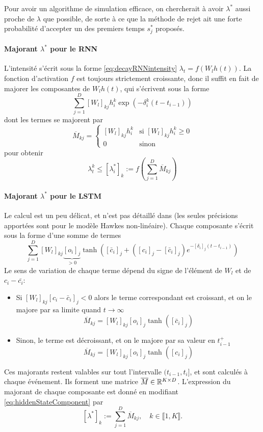 \documentclass[../main.tex]{subfiles}
\begin{document}
Pour avoir un algorithme de simulation efficace, on chercherait à avoir $\lambda^*$ aussi proche de $\lambda$ que possible, de sorte à ce que la méthode de rejet ait une forte probabilité d'accepter un des premiers temps $s_j^*$ proposés.\footnotemark


\paragraph{Majorant $\lambda^*$ pour le RNN} L'intensité s'écrit sous la forme \eqref{eq:decayRNNintensity} $\lambda_t = f(W_lh(t))$. La fonction d'activation $f$ est toujours strictement croissante, donc il suffit en fait de majorer les composantes de $W_lh(t)$, qui s'écrivent sous la forme
\[
	\sum_{j=1}^D {[W_l]}_{kj}h^k_{i}\exp(-\delta^k_i(t-t_{i-1}))
\]
dont les termes se majorent par
\[
	\overline{M}_{kj} = \begin{cases}
	{[W_l]}_{kj}h^k_i &\mbox{si }{[W_l]}_{kj}h^k_i \geq 0 \\
	0 &\mbox{sinon}
	\end{cases}
\]
pour obtenir
\[
	\lambda_t^k \leq {[\lambda_i^*]}_k := f\left(\sum_{j=1}^D \overline{M}_{kj}\right)
\]

\paragraph{Majorant $\lambda^*$ pour le LSTM} Le calcul est un peu délicat, et n'est pas détaillé dans \autocite{meiEisnerNeuralHawkes} (les seules précisions apportées sont pour le modèle Hawkes non-linéaire).
Chaque composante s'écrit sous la forme d'une somme de termes
\begin{equation}\label{eq:hiddenStateComponent}
	\sum_{j=1}^{D} {[W_l]}_{kj} \underbrace{{[o_i]}_j}_{>0}
	\tanh \left( [\bar{c}_{i}]_j + \left([c_{i}]_j - [\bar{c}_{i}]_j \right)e^{-[\delta_i]_j (t-t_{i-1})}
	\right)
\end{equation}
Le sens de variation de chaque terme dépend du signe de l'élément de $W_l$ et de $c_i - \bar{c_i}$:
\begin{itemize}
	\item Si ${[W_l]}_{kj}{[c_i - \bar{c}_i]}_{j} < 0$ alors le terme correspondant est croissant, et on le majore par sa limite quand $t\to\infty$
	\[
		\overline{M}_{kj} = {[W_l]}_{kj} {[o_i]}_j \tanh \left( [\bar{c}_{i}]_j\right)
	\]
	\item Sinon, le terme est décroissant, et on le majore par sa valeur en $t_{i-1}^{+}$
	\[
		\overline{M}_{kj} = {[W_l]}_{kj} {[o_i]}_j \tanh \left( [c_{i}]_j\right)
	\]
\end{itemize}
Ces majorants restent valables sur tout l'intervalle $(t_{i-1}, t_i]$, et sont calculés à chaque événement. Ils forment une matrice $\overline{M}\in\mathbb{R}^{K\times D}$. L'expression du majorant de chaque composante est donné en modifiant \eqref{eq:hiddenStateComponent} par
\[
	{[\lambda^{*}]}_k := \sum_{j=1}^{D} \overline{M}_{kj},\quad k\in \llbracket 1, K\rrbracket.
\]
\end{document}
